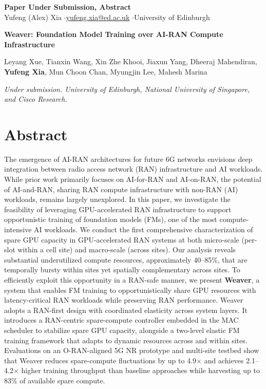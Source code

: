 \documentclass[letterpaper,11pt]{article}
\begin{document}
\begin{center}
  {\Large\textbf{Paper Under Submission, Abstract}}\\[2pt]
  {\small Yufeng (Alex) Xia \quad$\cdot$\quad \href{mailto:yufeng.xia@ed.ac.uk}{yufeng.xia@ed.ac.uk} \quad$\cdot$\quad University of Edinburgh}
\end{center}

\vspace{8pt}

{\large\textbf{Weaver: Foundation Model Training over AI-RAN Compute Infrastructure}}

\vspace{4pt}

{\small Leyang Xue, Tianxin Wang, Xin Zhe Khooi, Jiaxun Yang, Dheeraj Mahendiran, \textbf{Yufeng Xia},
Mun Choon Chan, Myungjin Lee, Mahesh Marina}

\vspace{2pt}

{\small\textit{Under submission. University of Edinburgh, National University of Singapore, and Cisco Research.}}

\vspace{10pt}

\section*{Abstract}

{\small
The emergence of AI-RAN architectures for future 6G networks envisions deep integration
between radio access network (RAN) infrastructure and AI workloads. While prior work
primarily focuses on AI-for-RAN and AI-on-RAN, the potential of AI-and-RAN, sharing RAN
compute infrastructure with non-RAN (AI) workloads, remains largely unexplored. In this
paper, we investigate the feasibility of leveraging GPU-accelerated RAN infrastructure to
support opportunistic training of foundation models (FMs), one of the most compute-intensive
AI workloads. We conduct the first comprehensive characterization of spare GPU capacity in
GPU-accelerated RAN systems at both micro-scale (per-slot within a cell site) and macro-scale
(across sites). Our analysis reveals substantial underutilized compute resources, approximately
40--85\%, that are temporally bursty within sites yet spatially complementary across sites. To
efficiently exploit this opportunity in a RAN-safe manner, we present \textbf{Weaver}, a system
that enables FM training to opportunistically share GPU resources with latency-critical RAN
workloads while preserving RAN performance. Weaver adopts a RAN-first design with coordinated
elasticity across system layers. It introduces a RAN-centric spare-compute controller embedded
in the MAC scheduler to stabilize spare GPU capacity, alongside a two-level elastic FM training
framework that adapts to dynamic resources across and within sites. Evaluations on an
O-RAN-aligned 5G NR prototype and multi-site testbed show that Weaver reduces spare-compute
fluctuations by up to 4.9$\times$ and achieves 2.1--4.2$\times$ higher training throughput than
baseline approaches while harvesting up to 83\% of available spare compute.
}
\end{document}
